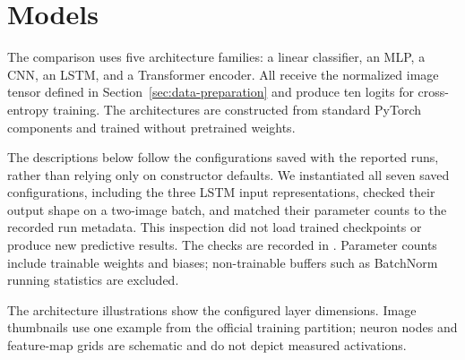 \section{Models}
\label{sec:models}

The comparison uses five architecture families: a linear classifier, an MLP, a CNN, an LSTM, and a Transformer encoder. All receive the normalized image tensor defined in Section~\ref{sec:data-preparation} and produce ten logits for cross-entropy training. The architectures are constructed from standard PyTorch components and trained without pretrained weights.

The descriptions below follow the configurations saved with the reported runs, rather than relying only on constructor defaults. We instantiated all seven saved configurations, including the three LSTM input representations, checked their output shape on a two-image batch, and matched their parameter counts to the recorded run metadata. This inspection did not load trained checkpoints or produce new predictive results. The checks are recorded in . Parameter counts include trainable weights and biases; non-trainable buffers such as BatchNorm running statistics are excluded.

The architecture illustrations show the configured layer dimensions. Image thumbnails use one example from the official training partition; neuron nodes and feature-map grids are schematic and do not depict measured activations.


\par{}\relax

\par{}\relax

\par{}\relax

\par{}\relax

\par{}\relax
